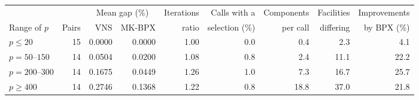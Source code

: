 \begin{tabular}{lrrrrrrrr}
\toprule
 & & \multicolumn{2}{c}{Mean gap (\%)} & Iterations & Calls with a & Components & Facilities & Improvements \\
Range of $p$ & Pairs & VNS & MK-BPX & ratio & selection (\%) & per call & differing & by BPX (\%) \\
\midrule
$p\leq 20$ & 15 & 0.0000 & 0.0000 & 1.00 & 0.0 & 0.4 & 2.3 & 4.1 \\
$p=50$--$150$ & 14 & 0.0504 & 0.0200 & 1.08 & 0.8 & 2.4 & 11.1 & 22.2 \\
$p=200$--$300$ & 14 & 0.1675 & 0.0449 & 1.26 & 1.0 & 7.3 & 16.7 & 25.7 \\
$p\geq 400$ & 14 & 0.2746 & 0.1368 & 1.22 & 0.8 & 18.8 & 37.0 & 21.8 \\
\bottomrule
\end{tabular}